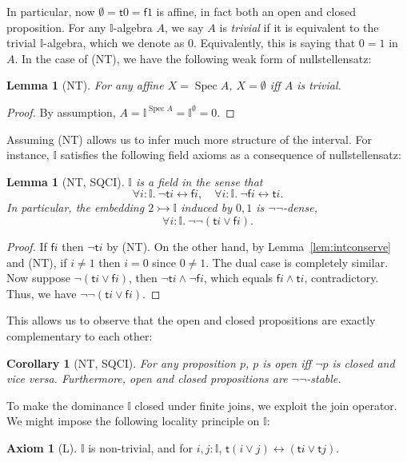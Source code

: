 \documentclass[12pt]{amsart}
\newtheorem{lemma}[theorem]{Lemma}
\newtheorem{corollary}[theorem]{Corollary}
\theoremstyle{definition}
\newtheorem{axiom}{Axiom}
\newcommand{\mbb}[1]{\mathbb{#1}}
\newcommand{\I}{\mbb I}
\newcommand{\ms}[1]{\mathsf{#1}}
\newcommand{\inj}{\rightarrowtail}
\newcommand{\dneg}{\neg\neg}
\newcommand{\fa}[2]{\forall #1\!\colon\!\!#2.\ }
\newcommand{\emp}{\emptyset}
\newcommand{\eq}{\leftrightarrow}
\newcommand{\spec}{\operatorname{Spec}}
\begin{document}
In particular, now $\emp = \ms t0 = \ms f1$ is affine, in fact both an open and closed proposition. For any $\I$-algebra $A$, we say $A$ is \emph{trivial} if it is equivalent to the trivial $\I$-algebra, which we denote as $0$. Equivalently, this is saying that $0 = 1$ in $A$. In the case of (NT), we have the following weak form of nullstellensatz:

\begin{lemma}[NT]\label{lem:nulls}
  For any affine $X = \spec A$, $X = \emp$ iff $A$ is trivial.
\end{lemma}
\begin{proof}
  By assumption, $A = \I^{\spec A} = \I^\emp = 0$. 
\end{proof}

Assuming (NT) allows us to infer much more structure of the interval. For instance, $\I$ satisfies the following field axioms as a consequence of nullstellensatz:

\begin{lemma}[NT, SQCI]\label{lem:field}
  $\I$ is a field in the sense that
  \[ \fa i{\I} \neg \ms ti \eq \ms fi, \quad \fa i\I \neg\ms fi \eq \ms ti. \]
  In particular, the embedding $2 \inj \I$ induced by $0,1$ is $\neg\neg$-dense,
  \[ \fa i\I \dneg(\ms ti \vee \ms fi). \]
\end{lemma}
\begin{proof}
  If $\ms fi$ then $\neg\ms ti$ by (NT). On the other hand, by Lemma~\ref{lem:intconserve} and (NT), if $i \neq 1$ then $i = 0$ since $0 \neq 1$. The dual case is completely similar. Now suppose $\neg(\ms ti \vee \ms fi)$, then $\neg\ms ti \wedge \neg \ms fi$, which equals $\ms fi \wedge \ms ti$, contradictory. Thus, we have $\dneg(\ms ti\vee\ms fi)$.
\end{proof}

This allows us to observe that the open and closed propositions are exactly complementary to each other:

\begin{corollary}[NT, SQCI]\label{cor:opendnegclose}
  For any proposition $p$, $p$ is open iff $\neg p$ is closed and vice versa. Furthermore, open and closed propositions are $\dneg$-stable.
\end{corollary}

To make the dominance $\I$ closed under finite joins, we exploit the join operator. We might impose the following locality principle on $\I$:

\begin{axiom}[L]
  $\I$ is non-trivial, and for $i,j : \I$, $\ms t(i \vee j) \eq (\ms ti \vee \ms tj)$.
\end{axiom}
\end{document}
